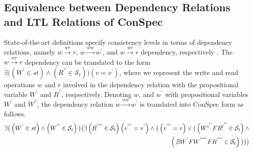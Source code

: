 \documentclass[acmlarge, ,11pt]{acmart}
\begin{document}
    \subsection{Equivalence between Dependency Relations and LTL Relations of ConSpec} \label{sec:equiv}
 State-of-the-art definitions specify consistency levels in terms of dependency relations, namely
  $w \xrightarrow{wr} r$,  $w \xrightarrow{ww} w^{'}$, and  $w \xrightarrow{wr} r$ dependency, respectively
  \cite{Hennessy:2011:CAF:1999263}.  The $w \xrightarrow{wr} r$ dependency can be translated to the form
  $\exists \big( %
  \left( W^{'} \in \mathit{st} \right)
  \wedge \left(  R^{''} \in \mathcal{S}_t \right) \big)  \left( v  = {v}^{'} \right)$, where we represent the write and read operations $w$ and $r$
  involved in the  dependency relation with the propositional variable $W^{'}$ and $R^{''}$, respectively. Denoting
  $w$, and $w^{'}$ with propositional variables $W^{'}$ and $W^{''}$, the
  dependency relation $w \xrightarrow{ww} w^{'}$ is translated into ConSpec form as follows.
  \begin{align}\label{eqn:ww}
\begin{split}
   \exists \big( %
   \left( {W}^{'} \in \mathit{st} \right)
   \wedge \left( {W}^{''}  \in  \mathcal{S}_t \right)  \big)
   \big( %
  \exists %
  \left( { R}^{''''} \in \mathcal{S}_t \right) %
   \left( {v}^{'''} = {v}^{'} \right)
   \wedge \big( \left(  {v}^{'''} = v \right) \vee
  \big( \left( {W^i}^{''} F { R^l}^{''} \in \mathcal{S}_t \right) \wedge \\
   \left(  \not\exists {W}^{'} F {W}^{'''''} F { R}^{''''} \in \mathcal{S}_t \right)  \big) \big) \big) %
   \end{split}
   \end{align}
\end{document}

